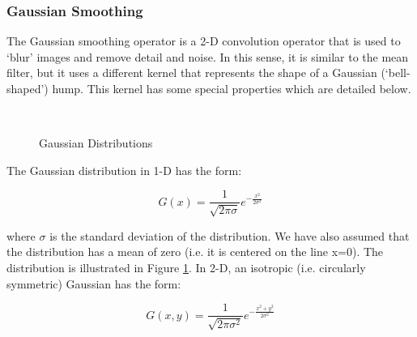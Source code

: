 \documentclass[12pt,fleqn]{book} %
\begin{document}
\subsubsection{Gaussian Smoothing}
The Gaussian smoothing operator is a 2-D convolution operator that is used to `blur' images and remove detail and noise. In this sense, it is similar to the mean filter, but it uses a different kernel that represents the shape of a Gaussian (`bell-shaped') hump. This kernel has some special properties which are detailed below.
\begin{figure}[]
\begin{dBox}
\centering
  \mbox{
   }
   \caption{Gaussian Distributions \label{fig:gaussian_dist} }   
\end{dBox}   
\end{figure}
\bigskip
The Gaussian distribution in 1-D has the form:
\begin{dBox}
\begin{equation}
	G(x) = \frac{1}{\sqrt{2\pi\sigma}}e^{-\frac{x^2}{2\sigma^2}}
\end{equation}
\end{dBox}
where $\sigma$  is the standard deviation of the distribution. We have also assumed that the distribution has a mean of zero (i.e. it is centered on the line x=0). The distribution is illustrated in Figure \ref{fig:gaussian_dist}.
\bigskip
In 2-D, an isotropic (i.e. circularly symmetric) Gaussian has the form:
\begin{dBox}
\begin{equation}
	G(x,y) = \frac{1}{\sqrt{2\pi\sigma^2}}e^{-\frac{x^2+y^2}{2\sigma^2}}
\end{equation}
\end{dBox}
\end{document}
